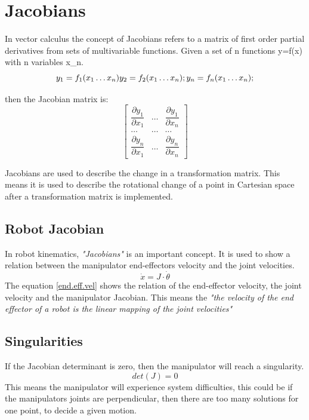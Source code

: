  \section{Jacobians}
 In vector calculus the concept of Jacobians refers to a matrix of first order partial derivatives from sets of multivariable functions. Given a set of n functions y=f(x) with n variables x\_n.\\

\begin{equation}
    y_1=f_1(x_1 \dots x_n)\\
    y_2=f_2(x_1 \dots x_n);\\
    \\
    y_n=f_n(x_1 \dots x_n);

\end{equation}

then the Jacobian matrix is:\\ 
\begin{equation}
\begin{bmatrix}
 \dfrac{\partial y_1}{\partial x_1} & \dots &  \dfrac{\partial y_1}{\partial x_n} \\
\dots & \dots & \dots \\
 \dfrac{\partial y_n}{\partial x_1} &  \dots &  \dfrac{\partial y_n}{\partial x_n} 
\end{bmatrix} 
\end{equation}

Jacobians are used to describe the change in a transformation matrix. This means it is used to describe the rotational change of a point in Cartesian space after a transformation matrix is implemented.


\subsection{Robot Jacobian}
In robot kinematics, \textit{"Jacobians"} is an important concept. 
It is used to show a relation between the manipulator end-effectors velocity and the joint velocities.\cite{ShaopingLN}
\begin{equation}\label{end.eff.vel}
    \dot x = J \cdot \dot{\theta}
\end{equation}
The equation \ref{end.eff.vel} shows the relation of the end-effector velocity, the joint velocity and the manipulator Jacobian. This means the \textit{"the velocity of the end effector of a robot is the linear mapping of the joint velocities" \cite{ShaopingLN}}\\

\subsection{Singularities}
If  the Jacobian determinant is zero, then the manipulator will reach a singularity. 
\begin{equation}
    det(J)=0
\end{equation}
This means the manipulator will experience system difficulties, this could be if the manipulators joints are perpendicular, then there are too many solutions for one point, to decide a given motion.